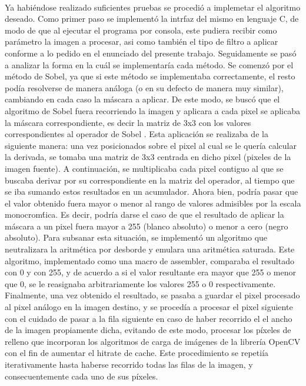 \documentclass[11pt, a4paper]{article}
\begin{document}
\paragraph*{}
Ya habi\'endose realizado suficientes pruebas se procedi\'o a implemetar el algoritmo deseado. Como primer paso se implement\'o la intrfaz del mismo en lenguaje C, de modo de que al ejecutar el programa por consola, este pudiera recibir como par\'ametro la imagen a procesar, asi como tambi\'en el tipo de filtro a aplicar conforme a lo pedido en el enunciado del presente trabajo.
Seguidamente se pas\'o a analizar la forma en la cu\'al se implementar\'ia cada m\'etodo. Se comenz\'o por el m\'etodo de Sobel, ya que si este m\'etodo se implementaba correctamente, el resto pod\'ia resolverse de manera an\'aloga (o en su defecto de manera muy similar), cambiando en cada caso la m\'ascara a aplicar.
De este modo, se busc\'o que el algoritmo de Sobel fuera recorriendo la imagen y aplicara a cada pixel se aplicaba la m\'ascara correspondiente, es decir la matriz de 3x3 con los valores correspondientes al operador de Sobel . Esta aplicaci\'on se realizaba de la siguiente manera: una vez posicionados sobre el pixel al cual se le quer\'ia calcular la derivada, se tomaba una matriz de 3x3 centrada en dicho pixel (pixeles de la imagen fuente). A continuaci\'on, se multiplicaba cada pixel contiguo al que se buscaba derivar por su correspondiente en la matriz del operador, al tiempo que se iba sumando estos resultados en un acumulador.
Ahora bien, podr\'ia pasar que el valor obtenido fuera mayor o menor al rango de valores admisibles por la escala monocrom\'tica. Es decir, podr\'ia darse el caso de que el resultado de aplicar la m\'ascara a un pixel fuera mayor a 255 (blanco absoluto) o menor a cero (negro absoluto). Para subsanar esta situaci\'on, se implement\'o un algoritmo que neutralizara la aritm\'etica por desborde y emulara una aritm\'etica saturada. Este algoritmo, implementado como una macro de assembler, comparaba el resultado con 0 y con 255, y de acuerdo a si el valor resultante era mayor que 255 o menor que 0, se le reasignaba arbitrariamente los valores 255 o 0 respectivamente.\\
Finalmente, una vez obtenido el resultado, se pasaba a guardar el pixel procesado al pixel an\'alogo en la imagen destino, y se proced\'ia a procesar el pixel siguiente con el cuidado de pasar a la fila siguiente en caso de haber recorrido el el ancho de la imagen propiamente dicha, evitando de este modo, procesar los p\'ixeles de relleno que incorporan los algoritmos de carga de im\'agenes de la librer\'ia OpenCV con el fin de aumentar el hitrate de cache. Este procedimiento se repeti\'ia iterativamente hasta haberse recorrido todas las filas de la imagen, y consecuentemente cada uno de sus p\'ixeles.
\end{document}
